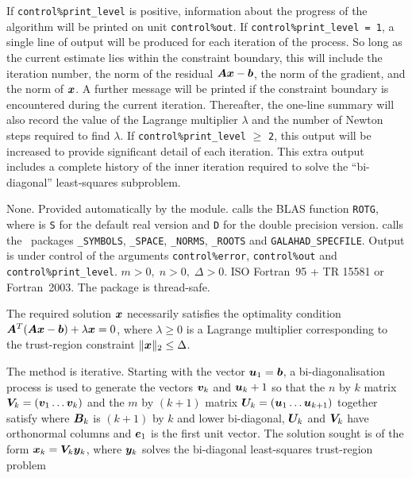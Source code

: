 \documentclass{galahad}
\newcommand{\packagename}{LS\-TR}
\begin{document}

\galinfo
If {\tt control\%print\_level} is positive, information about the progress
of the algorithm will be printed on unit {\tt control\-\%\-out}.
If {\tt control\%print\_level = 1}, a single line of output will be produced
for each iteration of the process. So long as the current estimate lies
within the constraint boundary, this will include
the iteration number, the norm of the residual ${\bm{A}}{\bm{x}}-{\bm{b}}$, the
norm of the gradient, and the norm of ${\bm{x}}$.
A further message will be printed
if the constraint boundary is encountered during the current iteration.
Thereafter, the one-line summary will also record the value of the Lagrange
multiplier $\lambda$ and the number of Newton steps required to find $\lambda$.
If {\tt control\%print\_level} $\geq$ {\tt 2}, this
output will be increased to provide significant detail of each iteration.
This extra output includes a complete history of the inner iteration required
to solve the ``bi-diagonal'' least-squares subproblem.


\galgeneral

\galcommon None.
\galworkspace Provided automatically by the module.
\galroutines {\tt \packagename\_solve} calls the
BLAS function {\tt *ROTG}, where {\tt *} is {\tt S} for
the default real version and {\tt D} for the double precision version.
\galmodules {\tt \packagename\_solve} calls the \galahad\ packages
{\tt \libraryname\_SY\-M\-BOLS},
{\tt \libraryname\_SPACE},
{\tt \libraryname\_NORMS},
{\tt \libraryname\_\-ROOTS} and
{\tt GALAHAD\_SPECFILE}.
\galio Output is under control of the arguments
{\tt control\%error}, {\tt control\%out} and {\tt control\%print\_level}.
\galrestrictions $m > 0, \; n  >  0, \;  \Delta  >  0$.
\galportability ISO Fortran~95 + TR 15581 or Fortran~2003.
The package is thread-safe.


\galmethod
The required solution ${\bm{x}}$ necessarily satisfies the optimality condition
${\bm{A}}^T ( {\bm{A}} {\bm{x}} - {\bm{b}} ) + \lambda {\bm{x}} = 0$, where $\lambda \geq 0$
is a Lagrange
multiplier corresponding to the trust-region constraint
$\|{\bm{x}}\|_2  \leq  \Delta$.

\noindent
The method is iterative. Starting  with the vector ${\bm{u}}_1 = {\bm{b}}$, a
bi-diagonalisation process is used to generate the vectors ${\bm{v}}_k$ and
${\bm{u}}_k+1$ so that the $n$ by $k$ matrix ${\bm{V}}_k = ( {\bm{v}}_1 \ldots {\bm{v}}_k)$
and the $m$ by $(k+1)$ matrix ${\bm{U}}_k = ( {\bm{u}}_1 \ldots {\bm{u}}_{k+1})$
together satisfy
where ${\bm{B}}_k$ is $(k+1)$ by $k$ and lower bi-diagonal, ${\bm{U}}_k$ and
${\bm{V}}_k$ have orthonormal columns and ${\bm{e}}_1$ is the first unit vector.
The solution sought is of the form ${\bm{x}}_k = {\bm{V}}_k {\bm{y}}_k$, where ${\bm{y}}_k$
solves the bi-diagonal least-squares trust-region problem
\end{document}
